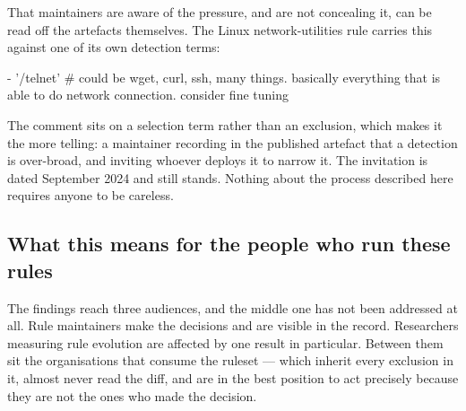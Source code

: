 That maintainers are aware of the pressure, and are not concealing it, can be read off the artefacts themselves. The Linux network-utilities rule carries this against one of its own detection terms:

- '/telnet' \# could be wget, curl, ssh, many things. basically everything that is able to do network connection. consider fine tuning

The comment sits on a selection term rather than an exclusion, which makes it the more telling: a maintainer recording in the published artefact that a detection is over-broad, and inviting whoever deploys it to narrow it. The invitation is dated September 2024 and still stands. Nothing about the process described here requires anyone to be careless.

\subsection{What this means for the people who run these rules}

The findings reach three audiences, and the middle one has not been addressed at all. Rule maintainers make the decisions and are visible in the record. Researchers measuring rule evolution are affected by one result in particular. Between them sit the organisations that consume the ruleset --- which inherit every exclusion in it, almost never read the diff, and are in the best position to act precisely because they are not the ones who made the decision.

